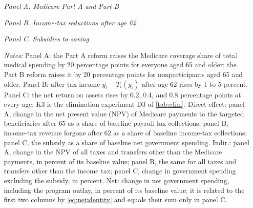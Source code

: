 \begin{table}[!tp]
\centering
\caption{Medicare, Old-Age Income-Tax, and Retirement-Saving Reforms}
\label{tab:other}
\vspace{6pt}
\footnotesize
\setlength{\tabcolsep}{4pt}%
\begin{threeparttable}
\textit{Panel A. Medicare Part A and Part B}\par\vspace{3pt}
\cleargradientmacros

\par\vspace{8pt}
\textit{Panel B. Income-tax reductions after age 62}\par\vspace{3pt}
\cleargradientmacros

\par\vspace{8pt}
\textit{Panel C. Subsidies to saving}\par\vspace{3pt}
\cleargradientmacros

\begin{tablenotes}[flushleft]\scriptsize
\item[] \textit{Notes:} Panel A: the Part A reform raises the Medicare coverage share of total medical spending by 20 percentage points for everyone aged 65 and older; the Part B reform raises it by 20 percentage points for nonparticipants aged 65 and older. Panel B: after-tax income $y_t-T_t(y_t)$ after age 62 rises by 1 to 5 percent. Panel C: the net return on assets rises by 0.2, 0.4, and 0.8 percentage points at every age; K3 is the elimination experiment D3 of \autoref{tab:elim}.
Direct effect: panel A, change in the net present value (NPV) of Medicare payments to the targeted beneficiaries after 65 as a share of baseline payroll-tax collections; panel B, income-tax revenue forgone after 62 as a share of baseline income-tax collections; panel C, the subsidy as a share of baseline net government spending.
Indir.: panel A, change in the NPV of all taxes and transfers other than the Medicare payments, in percent of its baseline value; panel B, the same for all taxes and transfers other than the income tax; panel C, change in government spending excluding the subsidy, in percent. Net: change in net government spending, including the program outlay, in percent of its baseline value; it is related to the first two columns by \eqref{eq:netidentity} and equals their sum only in panel C.

\end{tablenotes}
\end{threeparttable}
\end{table}
